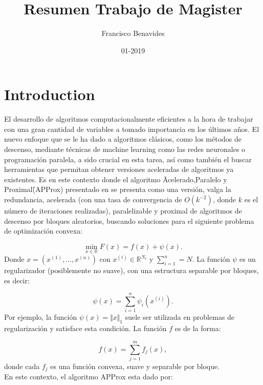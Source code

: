 \documentclass{article}
\title{Resumen Trabajo de Magister}
\author{Francisco Benavides}
\date{01-2019}
\newcommand{\R}{\mathbb{R}}
\begin{document}
\maketitle


\section{Introduction}

El desarrollo de algoritmos computacionalmente eficientes a la hora de trabajar con una gran cantidad de variables a tomado importancia en los últimos años. El nuevo enfoque que se le ha dado a algoritmos clásicos, como los métodos de descenso, mediante técnicas de machine learning como las redes neuronales o programación paralela, a sido crucial en esta tarea, así como también el buscar herramientas que permitan obtener versiones aceleradas de algoritmos ya existentes. Es en este contexto donde el algoritmo \"Acelerado,Paralelo y Proximal\" (APProx) presentado en \cite{Fercoq_Richtarik} se presenta como una versión, valga la redundancia, acelerada (con una tasa de convergencia de $O(k^{-2})$, donde $k$ es el número de iteraciones realizadas), paralelizable y proximal de algoritmos de descenso por bloques aleatorios, buscando soluciones para el siguiente problema de optimización convexa:

\begin{equation}
	\label{eq:main_problem}
	\min_{x \in \R} F(x) = f(x) + \psi(x).
\end{equation}
Donde $x = \left( x^{(1)},\ldots,x^{(n)} \right)$ con $x^{(i)} \in \R^{N_i}$ y $\sum_{i=1}^n = N$. La función $\psi$ es un regularizador (posiblemente no suave), con una estructura separable por bloques, es decir:

\begin{equation*}
	\psi(x) = \sum_{i=1}^n \psi_i\left(x^{(i)}\right).
\end{equation*}
Por ejemplo, la función  $\psi(x) = \Vert x\Vert_1$ suele ser utilizada en problemas de regularización y satisface esta condición. La función $f$ es de la forma:

\begin{equation*}
	f(x) = \sum_{j=1}^m f_j(x),
\end{equation*}
donde cada $f_j$ es una función convexa, suave y separable por bloque. \\

En este contexto, el algoritmo APProx esta dado por:
\end{document}
